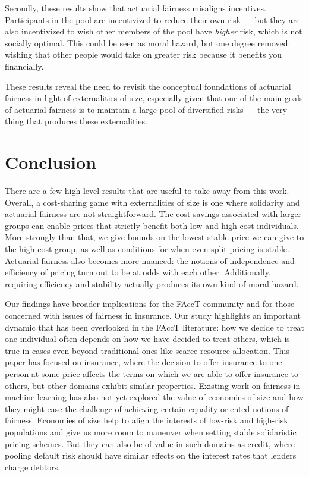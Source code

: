 \documentclass[sigconf]{acmart}
\begin{document}
Secondly, these results show that actuarial fairness misaligns incentives. Participants in the pool are incentivized to reduce their own risk --- but they are also incentivized to wish other members of the pool have \emph{higher} risk, which is not socially optimal. This could be seen as moral hazard, but one degree removed: wishing that other people would take on greater risk because it benefits you financially.


These results reveal the need to revisit the conceptual foundations of actuarial fairness in light of externalities of size, especially given that one of the main goals of actuarial fairness is to maintain a large pool of diversified risks --- the very thing that produces these externalities.

\section{Conclusion}
There are a few high-level results that are useful to take away from this work. Overall, a cost-sharing game with externalities of size is one where solidarity and actuarial fairness are not straightforward. The cost savings associated with larger groups can enable prices that strictly benefit both low and high cost individuals. More strongly than that, we give bounds on the lowest stable price we can give to the high cost group, as well as conditions for when even-split pricing is stable. Actuarial fairness also becomes more nuanced: the notions of independence and efficiency of pricing turn out to be at odds with each other. Additionally, requiring efficiency and stability actually produces its own kind of moral hazard. 

Our findings have broader implications for the FAccT community and for those concerned with issues of fairness in insurance. Our study highlights an important dynamic that has been overlooked in the FAccT literature: how we decide to treat one individual often depends on how we have decided to treat others, which is true in cases even beyond traditional ones like scarce resource allocation. This paper has focused on insurance, where the decision to offer insurance to one person at some price affects the terms on which we are able to offer insurance to others, but other domains exhibit similar properties. Existing work on fairness in machine learning has also not yet explored the value of economies of size and how they might ease the challenge of achieving certain equality-oriented notions of fairness. Economies of size help to align the interests of low-risk and high-risk populations and give us more room to maneuver when setting stable solidaristic pricing schemes. But they can also be of value in such domains as credit, where pooling default risk should have similar effects on the interest rates that lenders charge debtors.
\end{document}
